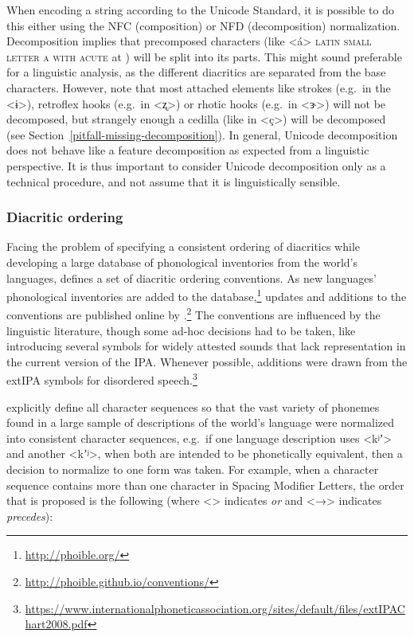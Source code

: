 When encoding a string according to the Unicode Standard, it is possible to do
this either using the NFC (composition) or NFD (decomposition) normalization.
Decomposition implies that precomposed characters (like <á> \textsc{latin small
letter a with acute} at ) will be split into its parts. This might
sound preferable for a linguistic analysis, as the different diacritics are
separated from the base characters. However, note that most attached elements
like strokes (e.g.~in the <ɨ>), retroflex hooks (e.g.~in <ʐ>) or rhotic hooks
(e.g.~in <ɝ>) will not be decomposed, but strangely enough a cedilla (like in
<ç>) will be decomposed (see Section~\ref{pitfall-missing-decomposition}). In
general, Unicode decomposition does not behave like a feature decomposition as
expected from a linguistic perspective. It is thus important to consider Unicode
decomposition only as a technical procedure, and not assume that it is
linguistically sensible.

\subsubsection*{Diacritic ordering}

Facing the problem of specifying a consistent ordering of diacritics while
developing a large database of phonological inventories from the world's
languages, \citet[540]{Moran2012} defines a set of diacritic ordering
conventions. As new languages' phonological inventories are added to the 
database,\footnote{\url{http://phoible.org/}} updates and additions to the 
conventions are published online by \cite{MoranMcCloy2014}.\footnote{
\url{http://phoible.github.io/conventions/}} The conventions are influenced by
the linguistic literature, though some ad-hoc decisions had to be taken, like 
introducing several symbols for widely attested sounds that lack representation 
in the current version of the IPA. Whenever possible, additions were drawn from 
the extIPA symbols for disordered speech.\footnote{\url{https://www.internationalphoneticassociation.org/sites/default/files/extIPAChart2008.pdf}}

\cite{MoranMcCloy2014} explicitly define all character sequences so that the vast variety
of phonemes found in a large sample of descriptions of the world's language were normalized into
consistent character sequences, e.g.~if one language description uses <kʲʼ> and
another <kʼʲ>, when both are intended to be phonetically equivalent, then a decision
to normalize to one form was taken. For example, when a character sequence
contains more than one character in Spacing Modifier Letters, the order that is
proposed is the following (where <\textbar{}> indicates \textit{or} and <→>
indicates \textit{precedes}):

